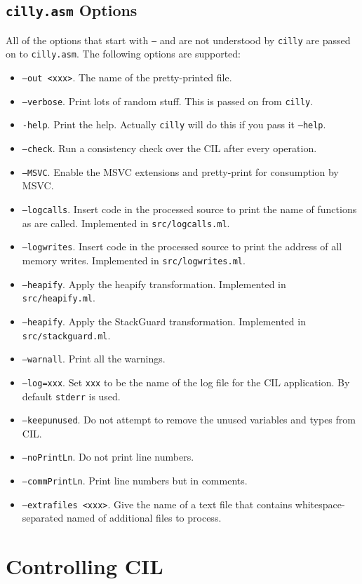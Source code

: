 \documentclass{article}
\def\t#1{{\tt #1}}
\begin{document}
 
  \subsection{\t{cilly.asm} Options}

 All of the options that start with \t{--} and are not understood by
\t{cilly} are passed on to \t{cilly.asm}. The following options are
supported:
\begin{itemize}
\item \t{--out <xxx>}. The name of the pretty-printed file.
\item \t{--verbose}. Print lots of random stuff. This is passed on from
\t{cilly}.
\item \t{-help}. Print the help. Actually \t{cilly} will do this if you
      pass it \t{--help}.  
\item \t{--check}. Run a consistency check over the CIL after every operation. 
\item \t{--MSVC}. Enable the MSVC extensions and pretty-print for consumption
by MSVC.
\item \t{--logcalls}. Insert code in the processed source to print the name of
functions as are called. Implemented in \t{src/logcalls.ml}.
\item \t{--logwrites}. Insert code in the processed source to print the
address of all memory writes. Implemented in \t{src/logwrites.ml}.
\item \t{--heapify}. Apply the heapify transformation.
                     Implemented in \t{src/heapify.ml}.
\item \t{--heapify}. Apply the StackGuard transformation.
                     Implemented in \t{src/stackguard.ml}.
\item \t{--warnall}. Print all the warnings.
\item \t{--log=xxx}. Set \t{xxx} to be the name of the log file for the CIL
application. By default \t{stderr} is used.
\item \t{--keepunused}. Do not attempt to remove the unused variables and
       types from CIL. 
\item \t{--noPrintLn}. Do not print line numbers.
\item \t{--commPrintLn}. Print line numbers but in comments.
\item \t{--extrafiles <xxx>}. Give the name of a text file that contains
whitespace-separated named of additional files to process.
\end{itemize}


\section{Controlling CIL}
\end{document}
